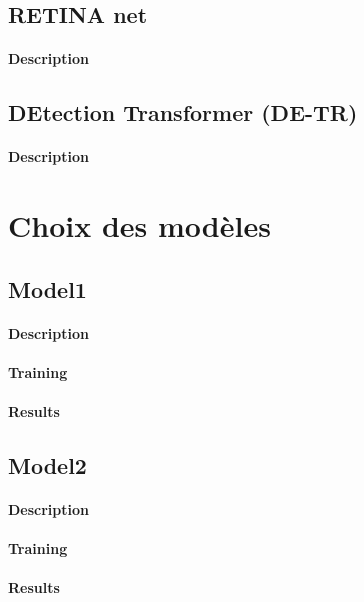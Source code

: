 \subsection{RETINA net}
\paragraph{Description}

\subsection{DEtection Transformer (DE-TR)}
\paragraph{Description}


\section{Choix des modèles}

\subsection{Model1}
\paragraph{Description}
\paragraph{Training}
\paragraph{Results}

\subsection{Model2}
\paragraph{Description}
\paragraph{Training}
\paragraph{Results}